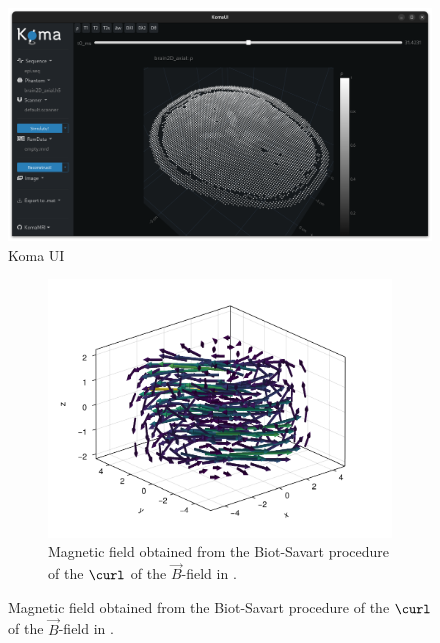 \documentclass[10pt]{article}
\begin{document}
  \begin{figure}[H]
    \centering
    \includegraphics[width=\linewidth]{../figures/komaui.png}
    \caption{Koma UI}
    \label{fig:komaui}
  \end{figure}

  \begin{figure}[H]
    \begin{subfigure}[t]{0.48\textwidth}
      \centering
      \includegraphics[width=\textwidth]{../figures/cdpbr-b-field.pdf}
      \caption{Magnetic field obtained from the Biot-Savart procedure of the $\curl$ of the $\vec{B}$-field in .}
      \label{fig:cdpbr-b-field}
    \end{subfigure}
  \end{figure}
\end{document}
